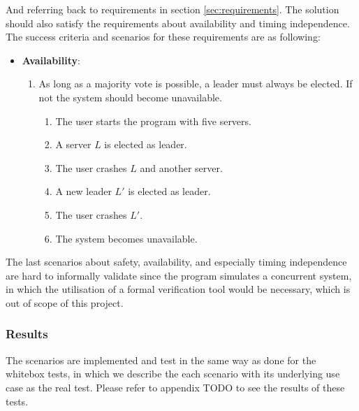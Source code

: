 And referring back to requirements in section \ref{sec:requirements}. The solution should also satisfy the requirements about availability and timing independence. The success criteria and scenarios for these requirements are as following:
\begin{itemize}
\item \textbf{Availability}:
    \begin{enumerate}
    \item As long as a majority vote is possible, a leader must always be elected. If not the system should become unavailable.
        \begin{enumerate}
        \item The user starts the program with five servers.
        \item A server $L$ is elected as leader.
        \item The user crashes $L$ and another server.
        \item A new leader $L'$ is elected as leader.
        \item The user crashes $L'$.
        \item The system becomes unavailable.
        \end{enumerate}
    \end{enumerate}
\end{itemize}
The last scenarios about safety, availability, and especially timing independence are hard to informally validate since the program simulates a concurrent system, in which the utilisation of a formal verification tool would be necessary, which is out of scope of this project. %

\subsubsection{Results}
The scenarios are implemented and test in the same way as done for the whitebox tests, in which we describe the each scenario with its underlying use case as the real test. Please refer to appendix TODO to see the results of these tests.

    
